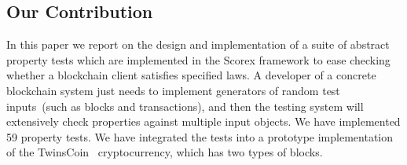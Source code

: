 
\subsection{Our Contribution}

In this paper we report on the design and implementation of a suite of abstract property tests which are implemented in the Scorex framework to ease checking whether a blockchain client satisfies specified laws. A developer of a concrete blockchain system just needs to implement generators of random test inputs~(such as blocks and transactions), and then the testing system will extensively check properties against multiple input objects. We have implemented 59 property tests. We have integrated the tests into a prototype implementation of the TwinsCoin~\cite{cryptoeprint:2017:232} cryptocurrency, which has two types of blocks.  
